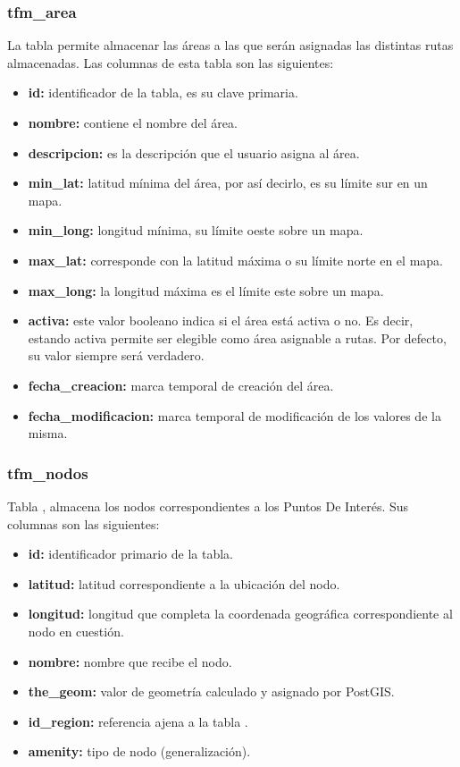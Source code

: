 \subsubsection{tfm\_area}
La tabla  permite almacenar las áreas a las que serán asignadas las distintas rutas almacenadas. Las columnas de esta tabla son las siguientes:

\begin{itemize}
	\item \textbf{id:} identificador de la tabla, es su clave primaria.
	\item \textbf{nombre:} contiene el nombre del área.
	\item \textbf{descripcion:} es la descripción que el usuario asigna al área.
	\item \textbf{min\_lat:} latitud mínima del área, por así decirlo, es su límite sur en un mapa.
	\item \textbf{min\_long:} longitud mínima, su límite oeste sobre un mapa.
	\item \textbf{max\_lat:} corresponde con la latitud máxima o su límite norte en el mapa.
	\item \textbf{max\_long:} la longitud máxima es el límite este sobre un mapa.
	\item \textbf{activa:} este valor booleano indica si el área está activa o no. Es decir, estando activa permite ser elegible como área asignable a rutas. Por defecto, su valor siempre será verdadero. 
	\item \textbf{fecha\_creacion:} marca temporal de creación del área.
	\item \textbf{fecha\_modificacion:} marca temporal de modificación de los valores de la misma.
\end{itemize}

\subsubsection{tfm\_nodos}
Tabla , almacena los nodos correspondientes a los Puntos De Interés. Sus columnas son las siguientes:

\begin{itemize}
	\item \textbf{id:} identificador primario de la tabla.
	\item \textbf{latitud:} latitud correspondiente a la ubicación del nodo.
	\item \textbf{longitud:} longitud que completa la coordenada geográfica correspondiente al nodo en cuestión.
	\item \textbf{nombre:} nombre que recibe el nodo.
	\item \textbf{the\_geom:} valor de geometría calculado y asignado por PostGIS.
	\item \textbf{id\_region:} referencia ajena a la tabla .
	\item \textbf{amenity:} tipo de nodo (generalización).
\end{itemize}

